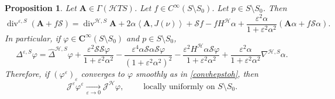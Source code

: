 \documentclass[11pt]{amsart}
\newcommand{\hhh}{{\mathcal{H}}}
\newcommand{\A}{\mathbf{A}}
\newcommand{\C}{\mathbf{C}}
\newcommand{\vh}{\nu}
\newcommand{\eps}{\varepsilon}
\newcommand{\s}{\mathcal S}
\DeclareMathOperator{\divv}{div}
\newcommand{\jacobi}{\mathcal{J}}
\newtheorem{proposition}[theorem]{Proposition}
\theoremstyle{definition}
\theoremstyle{remark}
\numberwithin{equation}{section}
\begin{document}
    \begin{proposition}
        Let $ \A\in\Gamma(\hhh T S)$. Let $f\in C^\infty(S\setminus S_0)$. Let $p\in S\setminus S_0$. Then
        \begin{equation}\label{diverepsilonespressa}
            \divv^{\eps,S}\left(\A+f\s\right)=\divv^{\hhh,S}\A+2\alpha \left\langle \A,J(\vh)\right\rangle+\s f-f H^\hhh\alpha+\frac{\eps^2\alpha}{1+\eps^2\alpha^2}\left(\A\alpha+f\s\alpha\right).
        \end{equation}
        In particular, if $\varphi\in\C^\infty(S\setminus S_0)$ and $p\in S\setminus S_0$,
        \begin{equation}\label{laplaepsilonespresso}
            \Delta^{\eps,S}\varphi=\hat \Delta^{\hhh,S}\varphi+\frac{\eps^2\s\s\varphi}{1+\eps^2\alpha^2}-\frac{\eps^4\alpha\s\alpha\s\varphi}{\left(1+\eps^2\alpha^2\right)^2}-\frac{\eps^2H^\hhh\alpha\s\varphi}{1+\eps^2\alpha^2}+\frac{\eps^2\alpha}{1+\eps^2\alpha^2}\nabla^{\hhh,S}\alpha.
        \end{equation}
        Therefore, if $(\varphi^\eps)_\eps$ converges to $\varphi$ smoothly as in \eqref{convhepstoh}, then
        \begin{equation}\label{jacepstojach}
        \jacobi^\eps\varphi^\eps\xrightarrow[\eps\to 0]{}\jacobi^\hhh\varphi,\qquad\text{ locally uniformly on $S\setminus S_0$.}
    \end{equation}
    \end{proposition}
\end{document}
